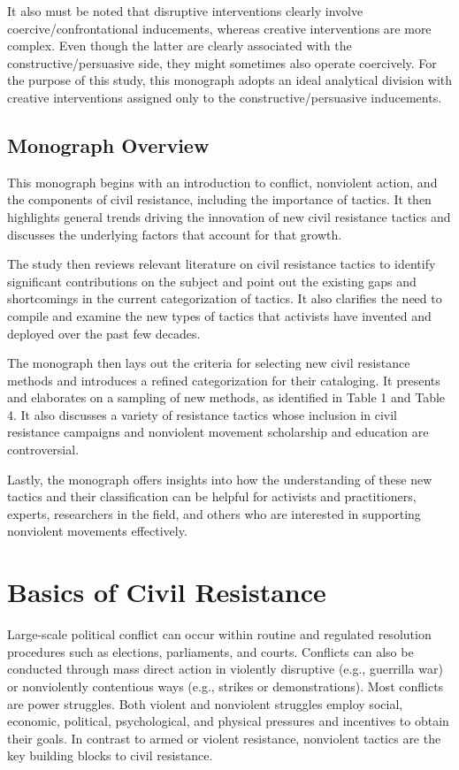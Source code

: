 \documentclass[twoside,a4paper,12pt,fleqn,openany]{extbook}
\begin{document}
It also must be noted that disruptive interventions clearly involve coercive/confrontational inducements, whereas creative interventions are more complex. Even though the latter are clearly associated with the constructive/persuasive side, they might sometimes also operate coercively. For the purpose of this study, this monograph adopts an ideal analytical division with creative interventions assigned only to the constructive/persuasive inducements.

\section*{Monograph Overview}

This monograph begins with an introduction to conflict, nonviolent action, and the components of civil resistance, including the importance of tactics. It then highlights general trends driving the innovation of new civil resistance tactics and discusses the underlying factors that account for that growth.

The study then reviews relevant literature on civil resistance tactics to identify significant contributions on the subject and point out the existing gaps and shortcomings in the current categorization of tactics. It also clarifies the need to compile and examine the new types of tactics that activists have invented and deployed over the past few decades.

The monograph then lays out the criteria for selecting new civil resistance methods and introduces a refined categorization for their cataloging. It presents and elaborates on a sampling of new methods, as identified in Table 1 and Table 4. It also discusses a variety of resistance tactics whose inclusion in civil resistance campaigns and nonviolent movement scholarship and education are controversial.

Lastly, the monograph offers insights into how the understanding of these new tactics and their classification can be helpful for activists and practitioners, experts, researchers in the field, and others who are interested in supporting nonviolent movements effectively.

\chapter{Basics of Civil Resistance}

Large-scale political conflict can occur within routine and regulated resolution procedures such as elections, parliaments, and courts. Conflicts can also be conducted through mass direct action in violently disruptive (e.g., guerrilla war) or nonviolently contentious ways (e.g., strikes or demonstrations). Most conflicts are power struggles. Both violent and nonviolent struggles employ social, economic, political, psychological, and physical pressures and incentives to obtain their goals. In contrast to armed or violent resistance, nonviolent tactics are the key building blocks to civil resistance.
\end{document}
